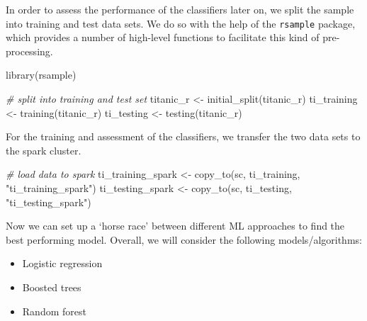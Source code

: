 \documentclass[
  12pt,
]{style/krantz}
\newenvironment{Shaded}{\begin{snugshade}}{\end{snugshade}}
\newcommand{\CommentTok}[1]{\textcolor[rgb]{0.56,0.35,0.01}{\textit{#1}}}
\newcommand{\FunctionTok}[1]{\textcolor[rgb]{0.00,0.00,0.00}{#1}}
\newcommand{\NormalTok}[1]{#1}
\newcommand{\OtherTok}[1]{\textcolor[rgb]{0.56,0.35,0.01}{#1}}
\newcommand{\StringTok}[1]{\textcolor[rgb]{0.31,0.60,0.02}{#1}}
\providecommand{\tightlist}{%
  \setlength{\itemsep}{0pt}\setlength{\parskip}{0pt}}
\begin{document}
In order to assess the performance of the classifiers later on, we split the sample into training and test data sets. We do so with the help of the \texttt{rsample} package, which provides a number of high-level functions to facilitate this kind of pre-processing.

\begin{Shaded}
\begin{Highlighting}[]
\FunctionTok{library}\NormalTok{(rsample)}

\CommentTok{\# split into training and test set}
\NormalTok{titanic\_r }\OtherTok{\textless{}{-}} \FunctionTok{initial\_split}\NormalTok{(titanic\_r)}
\NormalTok{ti\_training }\OtherTok{\textless{}{-}} \FunctionTok{training}\NormalTok{(titanic\_r)}
\NormalTok{ti\_testing }\OtherTok{\textless{}{-}} \FunctionTok{testing}\NormalTok{(titanic\_r)}
\end{Highlighting}
\end{Shaded}

For the training and assessment of the classifiers, we transfer the two data sets to the spark cluster.

\begin{Shaded}
\begin{Highlighting}[]
\CommentTok{\# load data to spark}
\NormalTok{ti\_training\_spark }\OtherTok{\textless{}{-}} \FunctionTok{copy\_to}\NormalTok{(sc, ti\_training, }\StringTok{"ti\_training\_spark"}\NormalTok{)}
\NormalTok{ti\_testing\_spark }\OtherTok{\textless{}{-}} \FunctionTok{copy\_to}\NormalTok{(sc, ti\_testing, }\StringTok{"ti\_testing\_spark"}\NormalTok{)}
\end{Highlighting}
\end{Shaded}

Now we can set up a `horse race' between different ML approaches to find the best performing model. Overall, we will consider the following models/algorithms:

\begin{itemize}
\tightlist
\item
  Logistic regression
\item
  Boosted trees
\item
  Random forest
\end{itemize}
\end{document}
